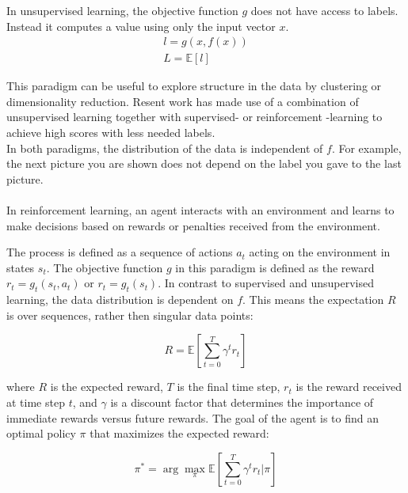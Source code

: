 In unsupervised learning, the objective function $g$ does not have access to labels. Instead it computes a value using only the input vector $x$.
\begin{equation}
    \label{unsupervised_learning_paradigm}
    \begin{aligned}
        l = g(x, f(x))\\
        L = \mathbb{E}\left[ l \right]
    \end{aligned}
\end{equation}

This paradigm can be useful to explore structure in the data by clustering or dimensionality reduction. Resent work has made use of a combination of unsupervised 
learning together with supervised- or reinforcement -learning to achieve high scores with less needed labels.\\

In both paradigms, the distribution of the data is independent of $f$. For example, the next picture you are shown does not depend on the label 
you gave to the last picture. \\ \\  

In reinforcement learning, an agent interacts with an environment and learns to make decisions based on rewards or penalties 
received from the environment. 


The process is defined as a sequence of actions $a_t$ acting on the environment in states $s_t$. The objective function 
$g$ in this paradigm is defined as the reward $r_t = g_t(s_t, a_t)$ or $r_t=g_t(s_t)$. In contrast to supervised and unsupervised learning, the data distribution 
is dependent on $f$. This means the expectation $R$ is over sequences, rather then singular data points:

\begin{equation}
    \label{reinforcement_paradigm}
    R = \mathbb{E}\left[\sum_{t=0}^{T} \gamma^t r_t\right]
\end{equation}

where $R$ is the expected reward, $T$ is the final time step, $r_t$ is the reward received at time step $t$, and $\gamma$ is a discount factor 
that determines the importance of immediate rewards versus future rewards. The goal of the agent is to find an optimal policy $\pi$ that maximizes 
the expected reward:

\begin{equation}
\label{policy}
\pi^* = \arg\max_{\pi} \mathbb{E}\left[\sum_{t=0}^{T} \gamma^t r_t | \pi\right]
\end{equation}

